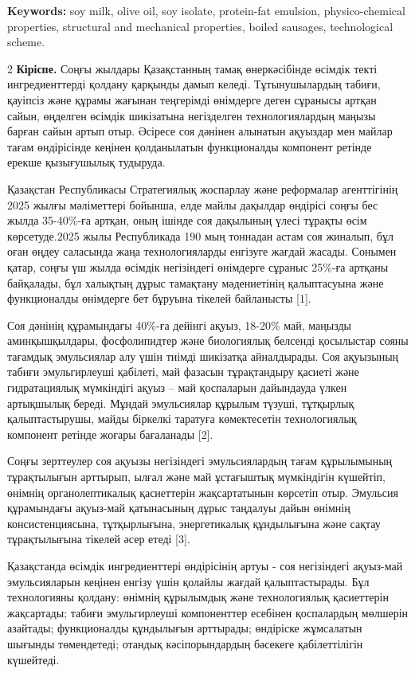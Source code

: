 {\bfseries Keywords:} soy milk, olive oil, soy isolate, protein-fat
emulsion, physico-chemical properties, structural and mechanical
properties, boiled sausages, technological scheme.

\begin{multicols}{2}
{\bfseries Кіріспе.} Соңғы жылдары Қазақстанның тамақ өнеркәсібінде өсімдік
текті ингредиенттерді қолдану қарқынды дамып келеді. Тұтынушылардың
табиғи, қауіпсіз және құрамы жағынан теңгерімді өнімдерге деген сұранысы
артқан сайын, өңделген өсімдік шикізатына негізделген технологиялардың
маңызы барған сайын артып отыр. Әсіресе соя дәнінен алынатын ақуыздар
мен майлар тағам өндірісінде кеңінен қолданылатын функционалды компонент
ретінде ерекше қызығушылық тудыруда.

Қазақстан Республикасы Стратегиялық жоспарлау және реформалар
агенттігінің 2025 жылғы мәліметтері бойынша, елде майлы дақылдар
өндірісі соңғы бес жылда 35-40\%-ға артқан, оның ішінде соя дақылының
үлесі тұрақты өсім көрсетуде.2025 жылы Республикада 190 мың тоннадан
астам соя жиналып, бұл оған өңдеу саласында жаңа технологияларды
енгізуге жағдай жасады. Сонымен қатар, соңғы үш жылда өсімдік
негізіндегі өнімдерге сұраныс 25\%-ға артқаны байқалады, бұл халықтың
дұрыс тамақтану мәдениетінің қалыптасуына және функционалды өнімдерге
бет бұруына тікелей байланысты {[}1{]}.

Соя дәнінің құрамындағы 40\%-ға дейінгі ақуыз, 18-20\% май, маңызды
аминқышқылдары, фосфолипидтер және биологиялық белсенді қосылыстар сояны
тағамдық эмульсиялар алу үшін тиімді шикізатқа айналдырады. Соя
ақуызының табиғи эмульгирлеуші қабілеті, май фазасын тұрақтандыру
қасиеті және гидратациялық мүмкіндігі ақуыз -- май қоспаларын дайындауда
үлкен артықшылық береді. Мұндай эмульсиялар құрылым түзуші, тұтқырлық
қалыптастырушы, майды біркелкі таратуға көмектесетін технологиялық
компонент ретінде жоғары бағаланады {[}2{]}.

Соңғы зерттеулер соя ақуызы негізіндегі эмульсиялардың тағам құрылымының
тұрақтылығын арттырып, ылғал және май ұстағыштық мүмкіндігін күшейтіп,
өнімнің органолептикалық қасиеттерін жақсартатынын көрсетіп отыр.
Эмульсия құрамындағы ақуыз-май қатынасының дұрыс таңдалуы дайын өнімнің
консистенциясына, тұтқырлығына, энергетикалық құндылығына және сақтау
тұрақтылығына тікелей әсер етеді {[}3{]}.

Қазақстанда өсімдік ингредиенттері өндірісінің артуы - соя негізіндегі
ақуыз-май эмульсияларын кеңінен енгізу үшін қолайлы жағдай
қалыптастырады. Бұл технологияны қолдану: өнімнің құрылымдық және
технологиялық қасиеттерін жақсартады; табиғи эмульгирлеуші компоненттер
есебінен қоспалардың мөлшерін азайтады; функционалды құндылығын
арттырады; өндіріске жұмсалатын шығынды төмендетеді; отандық
кәсіпорындардың бәсекеге қабілеттілігін күшейтеді.


\end{multicols}
